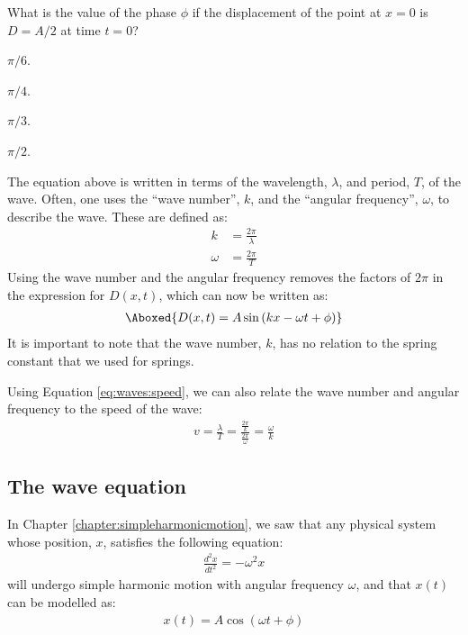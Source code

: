 \begin{checkpoint}
\begin{MCquestion}{What is the value of the phase $\phi$ if the displacement of the point at $x=0$ is $D=A/2$ at time $t=0$?}
\item $\pi/6$.\correct
\item $\pi/4$.
\item $\pi/3$.
\item $\pi/2$.
\end{MCquestion}
\end{checkpoint}

The equation above is written in terms of the wavelength, $\lambda$, and period, $T$, of the wave. Often, one uses the ``wave number'', $k$, and the ``angular frequency'', $\omega$, to describe the wave. These are defined as:
\begin{align}
k &= \frac{2\pi}{\lambda}\\
\omega &= \frac{2\pi}{T}
\end{align} 
Using the wave number and the angular frequency removes the factors of $2\pi$ in the expression for $D(x,t)$, which can now be written as:
\begin{align}
\Aboxed{D(x,t) = A\sin\left( kx -\omega t + \phi \right)}
\end{align}
It is important to note that the wave number, $k$, has no relation to the spring constant that we used for springs.

Using Equation \ref{eq:waves:speed}, we can also relate the wave number and angular frequency to the speed of the wave:
\begin{align*}
v = \frac{\lambda}{T}=\frac{\frac{2\pi}{k}}{\frac{2\pi}{\omega}}=\frac{\omega}{k}
\end{align*}

\subsection{The wave equation}
In Chapter \ref{chapter:simpleharmonicmotion}, we saw that any physical system whose position, $x$, satisfies the following equation:
\begin{align*}
\frac{d^2x}{dt^2}=-\omega^2 x
\end{align*}
will undergo simple harmonic motion with angular frequency $\omega$, and that $x(t)$ can be modelled as:
\begin{align*}
x(t) = A\cos(\omega t + \phi)
\end{align*}


